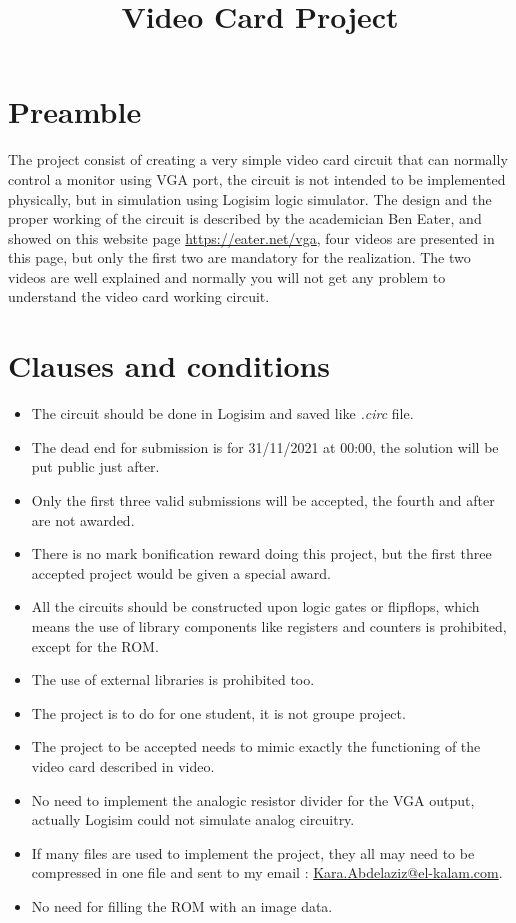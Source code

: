\documentclass[a4paper, french, 12pt]{article}
\title{\centering \textbf{Video Card Project}}
\author{}
\date{}
\begin{document}
\maketitle
\thispagestyle{fancy}

\section{Preamble}

The project consist of creating a very simple video card circuit that can normally control a monitor using VGA port, the circuit is not intended to be implemented physically, but in simulation using Logisim logic simulator. The design and the proper working of the circuit is described by the academician Ben Eater, and showed on this website page \underline{https://eater.net/vga}, four videos are presented in this page, but only the first two are mandatory for the realization. The two videos are well explained and normally you will not get any problem to understand the video card working circuit.

\section{Clauses and conditions}

\begin{itemize}

    \item The circuit should be done in Logisim and saved like \emph{.circ} file.
    \item The dead end for submission is for 31/11/2021 at 00:00, the solution will be put public just after.
    \item Only the first three valid submissions will be accepted, the fourth and after are not awarded.
    \item There is no mark bonification reward doing this project, but the first three accepted project would be given a special award.
    \item All the circuits should be constructed upon logic gates or flipflops, which means the use of library components like registers and counters is prohibited, except for the ROM.
    \item The use of external libraries is prohibited too.
    \item The project is to do for one student, it is not groupe project.
    \item The project to be accepted needs to mimic exactly the functioning of the video card described in video.
    \item No need to implement the analogic resistor divider for the VGA output, actually Logisim could not simulate analog circuitry.
    \item If many files are used to implement the project, they all may need to be compressed in one file and sent to my email : \underline{Kara.Abdelaziz@el-kalam.com}.
    \item No need for filling the ROM with an image data.
    
\end{itemize}
\end{document}
